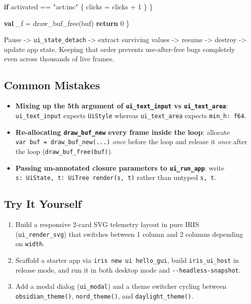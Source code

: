 \documentclass[
  english,
  oneside]{book}
\newenvironment{Shaded}{\begin{snugshade}}{\end{snugshade}}
\newcommand{\ControlFlowTok}[1]{\textcolor[rgb]{0.77,0.53,0.75}{\textbf{#1}}}
\newcommand{\DecValTok}[1]{\textcolor[rgb]{0.71,0.81,0.66}{#1}}
\newcommand{\KeywordTok}[1]{\textcolor[rgb]{0.34,0.61,0.84}{\textbf{#1}}}
\newcommand{\NormalTok}[1]{\textcolor[rgb]{0.83,0.83,0.83}{#1}}
\newcommand{\OperatorTok}[1]{\textcolor[rgb]{0.83,0.83,0.83}{#1}}
\newcommand{\StringTok}[1]{\textcolor[rgb]{0.81,0.57,0.47}{#1}}
\providecommand{\tightlist}{%
  \setlength{\itemsep}{0pt}\setlength{\parskip}{0pt}}
\begin{document}
\begin{Shaded}
\begin{Highlighting}[]
        \ControlFlowTok{if}\NormalTok{ activated }\OperatorTok{==} \StringTok{"act:inc"}\NormalTok{ \{}
\NormalTok{            clicks }\OperatorTok{=}\NormalTok{ clicks }\OperatorTok{+} \DecValTok{1}
\NormalTok{        \}}
\NormalTok{    \}}

    \KeywordTok{val}\NormalTok{ \_f }\OperatorTok{=}\NormalTok{ draw\_buf\_free(buf)}
    \ControlFlowTok{return} \DecValTok{0}
\NormalTok{\}}
\end{Highlighting}
\end{Shaded}

Pause -\textgreater{} \texttt{ui\_state\_detach} -\textgreater{} extract
surviving values -\textgreater{} resume -\textgreater{} destroy
-\textgreater{} update app state. Keeping that order prevents
use-after-free bugs completely even across thousands of live frames.

\subsection{Common Mistakes}\label{common-mistakes-15}

\begin{itemize}
\tightlist
\item
  \textbf{Mixing up the 5th argument of \texttt{ui\_text\_input} vs
  \texttt{ui\_text\_area}}: \texttt{ui\_text\_input} expects
  \texttt{UiStyle} whereas \texttt{ui\_text\_area} expects
  \texttt{min\_h:\ f64}.
\item
  \textbf{Re-allocating \texttt{draw\_buf\_new} every frame inside the
  loop}: allocate \texttt{var\ buf\ =\ draw\_buf\_new(...)} \emph{once}
  before the loop and release it \emph{once} after the loop
  (\texttt{draw\_buf\_free(buf)}).
\item
  \textbf{Passing un-annotated closure parameters to
  \texttt{ui\_run\_app}}: write
  \texttt{\textbar{}s:\ UiState,\ t:\ UiTree\textbar{}\ render(s,\ t)}
  rather than untyped \texttt{\textbar{}s,\ t\textbar{}}.
\end{itemize}

\subsection{Try It Yourself}\label{try-it-yourself-15}

\begin{enumerate}
\def\labelenumi{\arabic{enumi}.}
\tightlist
\item
  Build a responsive 2-card SVG telemetry layout in pure IRIS
  (\texttt{ui\_render\_svg}) that switches between 1 column and 2
  columns depending on \texttt{width}.
\item
  Scaffold a starter app via \texttt{iris\ new\ ui\ hello\_gui}, build
  \texttt{iris\_ui\_host} in release mode, and run it in both desktop
  mode and \texttt{-\/-headless-snapshot}.
\item
  Add a modal dialog (\texttt{ui\_modal}) and a theme switcher cycling
  between \texttt{obsidian\_theme()}, \texttt{nord\_theme()}, and
  \texttt{daylight\_theme()}.
\end{enumerate}
\end{document}

